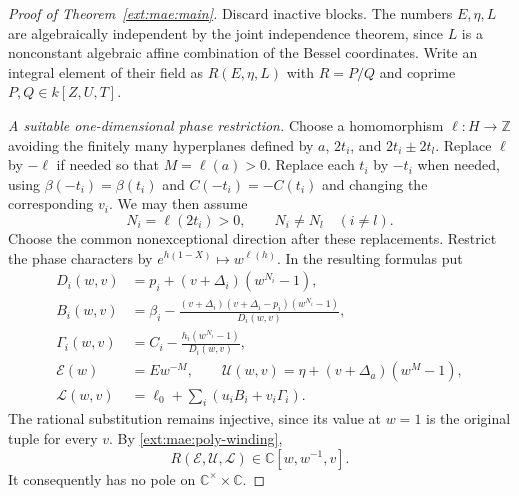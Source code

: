 \documentclass[11pt,a4paper]{article}
\theoremstyle{definition}\newtheorem{definition}[theorem]{Definition}
\theoremstyle{remark}\newtheorem{remark}[theorem]{Remark}
\begin{document}
\begin{proof}[Proof of Theorem~\ref{ext:mae:main}]
Discard inactive blocks.  The numbers $E,\eta,L$ are algebraically
independent by the joint independence theorem, since $L$ is a nonconstant
algebraic affine combination of the Bessel coordinates.  Write an integral element of their field
as $R(E,\eta,L)$ with $R=P/Q$ and coprime
$P,Q\in k[Z,U,T]$.

\emph{A suitable one-dimensional phase restriction.}
Choose a homomorphism $\ell:H\to\mathbb Z$ avoiding the finitely many
hyperplanes defined by $a$, $2t_i$, and $2t_i\pm2t_l$.
Replace $\ell$ by $-\ell$ if needed so that $M=\ell(a)>0$.
Replace each $t_i$ by $-t_i$ when needed, using
$\beta(-t_i)=\beta(t_i)$ and $C(-t_i)=-C(t_i)$ and changing the
corresponding $v_i$.  We may then assume
\[
        N_i=\ell(2t_i)>0,\qquad N_i\ne N_l\quad(i\ne l).
\]
Choose the common nonexceptional direction after these replacements.
Restrict the phase characters by $e^{h(1-X)}\mapsto w^{\ell(h)}$.
In the resulting formulas put
\begin{align*}
 D_i(w,v)&=p_i+(v+\Delta_i)(w^{N_i}-1),\\
 B_i(w,v)&=\beta_i-
 \frac{(v+\Delta_i)(v+\Delta_i-p_i)(w^{N_i}-1)}{D_i(w,v)},\\
 \Gamma_i(w,v)&=C_i-\frac{h_i(w^{N_i}-1)}{D_i(w,v)},\\
 \mathcal E(w)&=Ew^{-M},\qquad
 \mathcal U(w,v)=\eta+(v+\Delta_a)(w^M-1),\\
 \mathcal L(w,v)&=\ell_0+\sum_i(u_iB_i+v_i\Gamma_i).
\end{align*}
The rational substitution remains injective, since its value at $w=1$
is the original tuple for every $v$.  By \eqref{ext:mae:poly-winding},
\begin{equation}
 R(\mathcal E,\mathcal U,\mathcal L)
                         \in\mathbb C[w,w^{-1},v].
 \label{ext:mae:regular}
\end{equation}
It consequently has no pole on $\mathbb C^\times\times\mathbb C$.


\end{proof}
\end{document}
